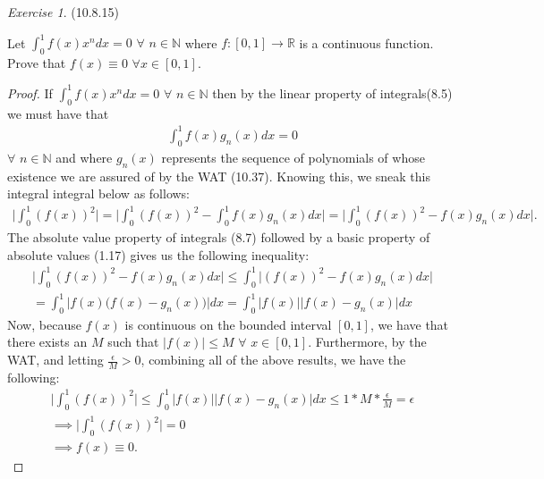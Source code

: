 \documentclass[12pt,oneside]{amsart}
\theoremstyle{definition}
\theoremstyle{remark}
\newtheorem{exer}{Exercise}
\numberwithin{equation}{exer}
\begin{document}
\newpage \indent
\begin{exer}(10.8.15)

Let $\int_0^1 f(x) x^n dx=0$ $\forall$ $n \in \mathbb{N}$ where $f:[0,1] \to \mathbb{R}$ is a continuous function. Prove that $f(x) \equiv 0$ $\forall x \in [0,1]$.
\end{exer}
\begin{proof}
If $\int_0^1 f(x) x^n dx=0$ $\forall$ $n \in \mathbb{N}$ then by the linear property of integrals(8.5) we must have that 
\begin{align*}
   \int_0^1 f(x) g_n(x) dx=0
\end{align*}
$\forall$ $n \in \mathbb{N}$ and where $g_n(x)$ represents the sequence of polynomials of whose existence we are assured of by the WAT (10.37). Knowing this, we sneak this integral integral below as follows:
\begin{align*}
    \Big|\int_0^1 (f(x))^2\Big|=\Big|\int_0^1 (f(x))^2-\int_0^1 f(x) g_n(x) dx\Big|= 
    \Big| \int_0^1 (f(x))^2- f(x) g_n(x) dx\Big|.
\end{align*}
The absolute value property of integrals (8.7) followed by a basic property of absolute values (1.17) gives us the following inequality:
\begin{align*}
    \Big| \int_0^1 (f(x))^2- f(x) g_n(x) dx\Big| \leq
    \int_0^1 \Big| (f(x))^2- f(x) g_n(x) dx \Big|\\
    = \int_0^1 \Big|f(x) \Big( f(x) -g_n(x)\Big)\Big| dx =
    \int_0^1 \Big|f(x)\Big|\Big|f(x)-g_n(x)\Big|dx
\end{align*}
Now, because $f(x)$ is continuous on the bounded interval $[0,1]$, we have that there exists an $M$ such that $\Big|f(x)\Big| \leq M$ $\forall$ $x \in [0,1]$. Furthermore, by the WAT, and letting $\frac{\epsilon}{M}>0$, combining all of the above results, we have the following:
\begin{align*}
        \Big|\int_0^1 (f(x))^2\Big| \leq
        \int_0^1 \Big|f(x)\Big|\Big|f(x)-g_n(x)\Big|dx \leq
        1*M*\frac{\epsilon}{M} = \epsilon\\
        \implies \Big|\int_0^1 (f(x))^2\Big| = 0\\
        \implies f(x) \equiv 0 .
\end{align*}
\end{proof}
\end{document}
